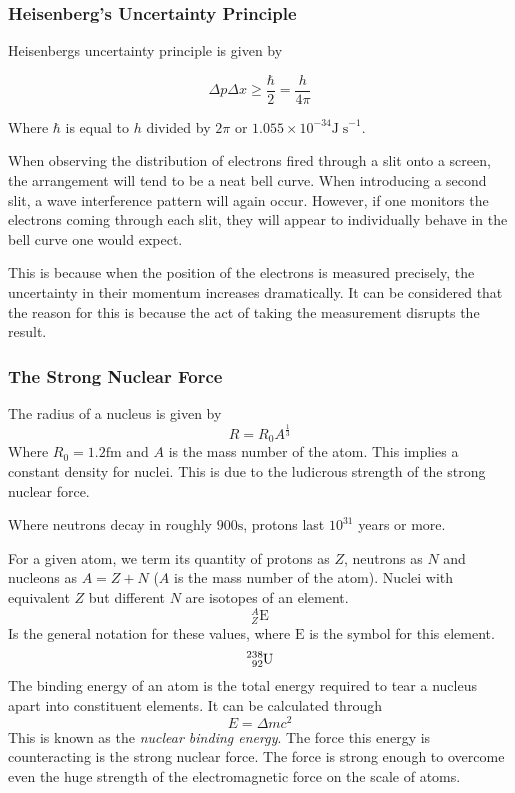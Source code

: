 \documentclass[12pt]{report}
\begin{document}
\begin{flushleft}
\subsubsection*{Heisenberg's Uncertainty Principle}

Heisenbergs uncertainty principle is given by

\[\Delta p\Delta x \geq \frac{\hbar}{2} = \frac{h}{4\pi}\]

Where \(\hbar\) is equal to \(h\) divided by \(2\pi\) or
\(1.055\times10^{-34}\mathrm{J\;s}^{-1}\). \par
When observing the distribution of electrons fired through a slit onto a
screen, the arrangement will tend to be a neat bell curve. When introducing
a second slit, a wave interference pattern will again occur. However, if one
monitors the electrons coming through each slit, they will appear to
individually behave in the bell curve one would expect. \par
This is because when the position of the electrons is measured precisely, the
uncertainty in their momentum increases dramatically. It can be considered that
the reason for this is because the act of taking the measurement disrupts the
result. 

\subsubsection*{The Strong Nuclear Force}

The radius of a nucleus is given by
\[R = R_0A^{\frac{1}{3}}\]
Where \(R_0 = 1.2\mathrm{fm}\) and \(A\) is the mass number of the atom. This
implies a constant density for nuclei. This is due to the ludicrous strength of
the strong nuclear force. \par
Where neutrons decay in roughly \(900\mathrm{s}\), protons last \(10^{31}\)
years or more. \par
For a given atom, we term its quantity of protons as \(Z\), neutrons as \(N\)
and nucleons as \(A = Z + N\) (\(A\) is the mass number of the atom). Nuclei
with equivalent \(Z\) but different \(N\) are isotopes of an element.
\[{}_Z^A\mathrm{E}\]
Is the general notation for these values, where \(\mathrm{E}\) is the symbol
for this element.
\[\tensor*[^{238}_{92}]{\mathrm{U}}{}\]
The binding energy of an atom is the total energy required to tear a nucleus
apart into constituent elements. It can be calculated through
\[E = \Delta mc^2\]
This is known as the \textit{nuclear binding energy}. The force this energy is
counteracting is the strong nuclear force. The force is strong enough to
overcome even the huge strength of the electromagnetic force on the scale of
atoms.


\end{flushleft}
\end{document}
